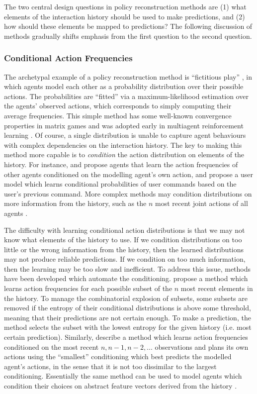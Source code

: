 \documentclass[final,1p,times,authoryear]{elsarticle}
\begin{document}
The two central design questions in policy reconstruction methods are (1) what elements of the interaction history should be used to make predictions, and (2) how should these elements be mapped to predictions? The following discussion of methods gradually shifts emphasis from the first question to the second question.


		\subsubsection{Conditional Action Frequencies} \label{sec:policyrec-conditional}

The archetypal example of a policy reconstruction method is ``fictitious play'' \citep{b1951}, in which agents model each other as a probability distribution over their possible actions. The probabilities are ``fitted'' via a maximum-likelihood estimation over the agents' observed actions, which corresponds to simply computing their average frequencies. This simple method has some well-known convergence properties in matrix games \citep{fl1998} and was adopted early in multiagent reinforcement learning \citep{cb1998}. Of course, a single distribution is unable to capture agent behaviours with complex dependencies on the interaction history. The key to making this method more capable is to \emph{condition} the action distribution on elements of the history. For instance, \citet{sa1997} and \citet{bs2007} propose agents that learn the action frequencies of other agents conditioned on the modelling agent's own action, and \citet{dh1998} propose a user model which learns conditional probabilities of user commands based on the user's previous command. More complex methods may condition distributions on more information from the history, such as the $n$ most recent joint actions of all agents \citep{ps2005}.

The difficulty with learning conditional action distributions is that we may not know what elements of the history to use. If we condition distributions on too little or the wrong information from the history, then the learned distributions may not produce reliable predictions. If we condition on too much information, then the learning may be too slow and inefficient. To address this issue, methods have been developed which automate the conditioning. \citet{jbgs2005} propose a method which learns action frequencies for each possible subset of the $n$ most recent elements in the history. To manage the combinatorial explosion of subsets, some subsets are removed if the entropy of their conditional distributions is above some threshold, meaning that their predictions are not certain enough. To make a prediction, the method selects the subset with the lowest entropy for the given history (i.e. most certain prediction). Similarly, \citet{cs2014} describe a method which learns action frequencies conditioned on the most recent $n, n-1, n-2, ...$ observations and plans its own actions using the ``smallest'' conditioning which best predicts the modelled agent's actions, in the sense that it is not too dissimilar to the largest conditioning. Essentially the same method can be used to model agents which condition their choices on abstract feature vectors derived from the history \citep{cs2013}.
\end{document}
